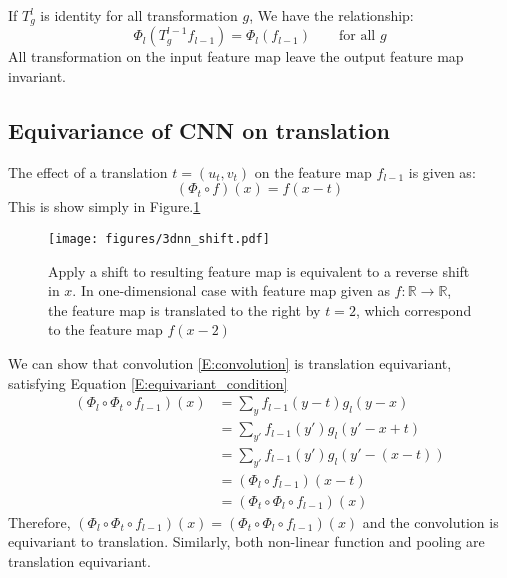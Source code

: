 \documentclass{article}
\begin{document}
If $T^l_g$ is identity for all transformation $g$, We have the relationship:
\begin{equation}
    \Phi_l (T^{l-1}_g f_{l-1}) = \Phi_l (f_{l-1})\qquad \text{for all $g$} \label{E:invariant_condition}
\end{equation}
All transformation on the input feature map leave the output feature map invariant.

\subsection*{Equivariance of CNN on translation}
The effect of a translation $t = (u_t,v_t)$ on the feature map $f_{l-1}$ is given as:
\begin{equation}
    \label{E:translation_on_featuremap}
    (\Phi_t \circ f) (x) = f(x-t)
\end{equation}
This is show simply in Figure.\ref{F:3dnn_shift}
\begin{figure}[h]
    \centering
    \texttt{[image: figures/3dnn\_shift.pdf]}
    \caption{Apply a shift to resulting feature map is equivalent to a reverse shift in $x$. 
                In one-dimensional case with feature map given as $f\colon \mathbb{R} \to \mathbb{R}$,
                the feature map is translated to the right by $t = 2$, which correspond to the feature map $f(x-2)$}
    \label{F:3dnn_shift}
\end{figure}

We can show that convolution \eqref{E:convolution} is translation equivariant, satisfying Equation \eqref{E:equivariant_condition}
\begin{align*}
    (\Phi_l \circ \Phi_t \circ f_{l-1}) (x) &= \sum_y f_{l-1}(y-t) g_l(y-x) \\
    &= \sum_{y'} f_{l-1}(y') g_l(y'-x+t) \\
    &= \sum_{y'} f_{l-1}(y') g_l(y'-(x-t)) \\
    &= (\Phi_l \circ f_{l-1}) (x-t) \\ &= (\Phi_t \circ \Phi_l \circ f_{l-1}) (x)
\end{align*}
Therefore, $(\Phi_l \circ \Phi_t \circ f_{l-1}) (x) = (\Phi_t \circ \Phi_l \circ f_{l-1}) (x)$ and the convolution
is equivariant to translation. Similarly, both non-linear function and pooling are translation equivariant.
\end{document}
